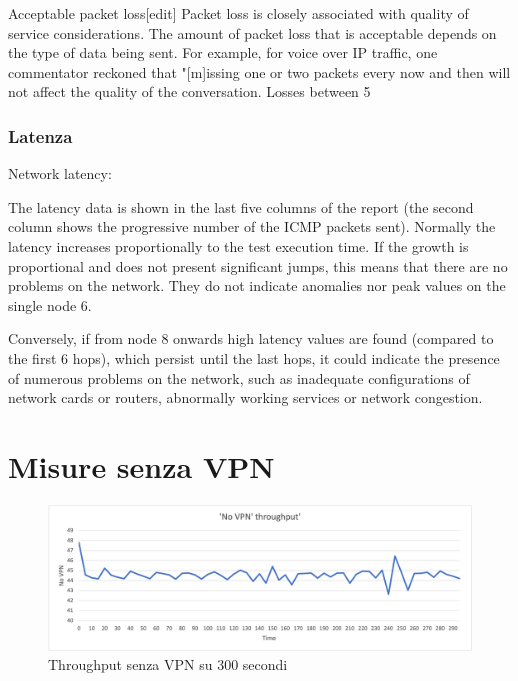 Acceptable packet loss[edit]
Packet loss is closely associated with quality of service considerations. The amount of packet loss that is acceptable depends on the type of data being sent. For example, for voice over IP traffic, one commentator reckoned that "[m]issing one or two packets every now and then will not affect the quality of the conversation. Losses between 5%

\subsubsection{Latenza}
Network latency:

The latency data is shown in the last five columns of the report (the second column shows the progressive number of the ICMP packets sent). Normally the latency increases proportionally to the test execution time. If the growth is proportional and does not present significant jumps, this means that there are no problems on the network. They do not indicate anomalies nor peak values on the single node 6.

Conversely, if from node 8 onwards high latency values are found (compared to the first 6 hops), which persist until the last hops, it could indicate the presence of numerous problems on the network, such as inadequate configurations of network cards or routers, abnormally working services or network congestion.


\section{Misure senza VPN}
\begin{figure}[ht]
    \centering
    \includegraphics[width=12cm]{figure/vpn_thr.png-1.png}
    \caption{Throughput senza VPN su 300 secondi}
\end{figure}


